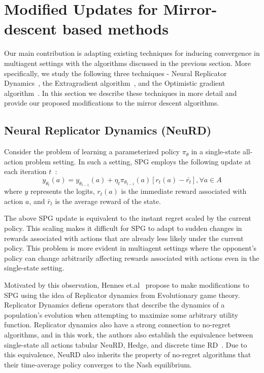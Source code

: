 \chapter{Modified Updates for Mirror-descent based methods}
\label{chp:updates}

Our main contribution is adapting existing techniques for inducing convergence in multiagent
settings with the algorithms discussed in the previous section.
More specifically, we study the following three techniques - Neural Replicator
Dynamics~\cite{hennesNeural2020}, the Extragradient algorithm~\cite{korpelevichextragradient1976},
and the Optimistic gradient algorithm~\cite{popovmodification1980}.
In this section we describe these techniques in more detail and provide our proposed modifications
to the mirror descent algorithms.

\section{Neural Replicator Dynamics (NeuRD)}


Consider the problem of learning a parameterized policy $\pi_{\theta}$ in a single-state all-action
problem setting.
In such a setting, SPG employs the following update at each iteration
$t$~\cite[Section~A.1]{hennesNeural2020}: \[y_{\theta_t}(a) = y_{\theta_{t-1}} (a) + \eta_t
	\pi_{\theta_{t-1}}(a) [r_t(a) - \bar{r_t}], \forall a \in A\] where $y$ represents the logits,
$r_t(a)$ is the immediate reward associated with action $a$, and $\bar{r}_t$ is the average reward
of the state.

The above SPG update is equivalent to the instant regret scaled by the current policy.
This scaling makes it difficult for SPG to adapt to sudden changes in rewards associated with
actions that are already less likely under the current policy.
This problem is more evident in multiagent settings where the opponent's policy can change
arbitrarily affecting rewards associated with actions even in the single-state setting.

Motivated by this observation, Hennes et.al~\cite{hennesNeural2020} propose to make modifications
to SPG using the idea of Replicator dynamics from Evolutionary game theory.
Replicator Dynamics defiens operators that describe the dynamics of a population's evolution when
attempting to maximize some arbitrary utility function.
Replicator dynamics also have a strong connection to no-regret algorithms, and in this work, the
authors also establish the equivalence between single-state all actions tabular NeuRD, Hedge, and
discrete time RD~\cite[Statement 1, p5]{hennesNeural2020}.
Due to this equivalence, NeuRD also inherits the property of no-regret algorithms that their
time-average policy converges to the Nash equilibrium.

